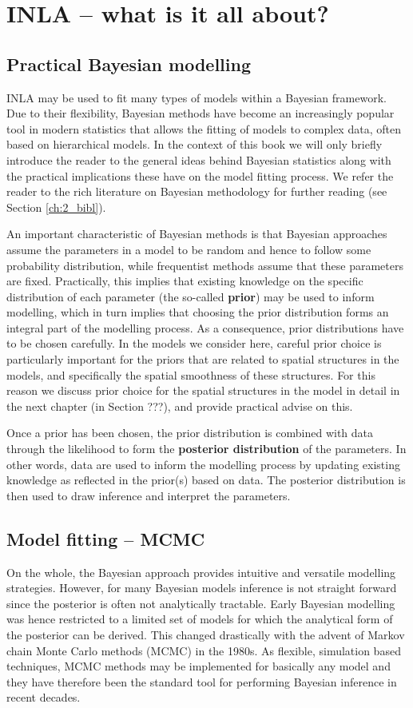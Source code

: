 \section{INLA -- what is it all about?}
\subsection{Practical Bayesian modelling}
INLA may be used to fit many types of models within a Bayesian framework.  Due to their flexibility, Bayesian methods have become an increasingly popular tool in modern statistics that allows the fitting of models to complex data, often based on hierarchical models. In the context of this book we will only briefly introduce the reader to the general ideas behind Bayesian statistics along with the practical implications these have on the model fitting process. We refer the reader to the rich literature on Bayesian methodology for further reading (see Section \ref{ch:2_bibl}). 

An important characteristic of Bayesian methods is that Bayesian approaches assume the parameters in a model to be random and hence to follow some probability distribution, while frequentist methods assume that these parameters are fixed. Practically, this implies that existing knowledge on the specific distribution of each parameter (the so-called \textbf{prior}) may be used to inform modelling, which in turn implies that choosing the prior distribution forms an integral part of the modelling process. As a consequence, prior distributions have to be chosen carefully. In the models we consider here, careful prior choice is particularly important for the priors that are related to spatial structures in the models, and specifically the spatial smoothness of these structures. For this reason we discuss prior choice for the spatial structures in the model in detail in the next chapter (in Section ???), and provide practical advise on this.  

Once a prior has been chosen, the prior distribution is combined with data through the likelihood to form the \textbf{posterior distribution} of the parameters. In other words, data are used to inform the modelling process by updating existing knowledge as reflected in the prior(s) based on data. The posterior distribution is then used to draw inference and interpret the parameters. 

\subsection{Model fitting -- MCMC}
On the whole, the Bayesian approach provides intuitive and versatile modelling strategies. However, for many Bayesian models inference is not straight forward since the posterior is often not analytically tractable. Early Bayesian modelling was hence restricted to  a limited set of models for which the analytical form of the posterior can be derived.
This changed drastically with the advent of Markov chain Monte Carlo methods (MCMC)  in the 1980s. As flexible, simulation based techniques, MCMC methods may be implemented for basically any model and they have therefore been the standard tool for performing Bayesian inference in recent decades. 

